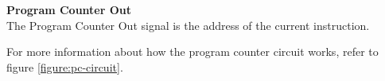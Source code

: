 
\begin{description}
\item{\textbf{Program Counter Out}} \\

The Program Counter Out signal is the address of the current instruction.

\end{description}

For more information about how the program counter circuit works, refer to figure \vref{figure:pc-circuit}.
